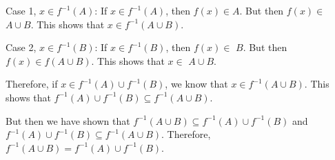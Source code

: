 \documentclass[11pt,letterpaper]{article}
\newcommand{\ansun}[2]{\underline{\hspace{#1}#2\hspace{#1}}} %
\begin{document}
	\hspace{1cm} Case 1, \ansun{0.55cm}{$x \in f^{-1}(A)$}: If $x \in f^{-1}(A)$, then $f(x) \in A$. But then $f(x) \in$ \ansun{0.97cm}{$A \cup B$}. \pspace \hspace{1cm} This shows that $x \in f^{-1}(A \cup B)$. \pvspace{1cm}

	\hspace{1cm} Case 2, $x \in f^{-1}(B)$: If $x \in f^{-1}(B)$, then $f(x) \in$ \ansun{1.32cm}{$B$}. But then $f(x) \in f(A \cup B)$. \pspace \hspace{1cm} This shows that $x \in$ \ansun{0.97cm}{$A \cup B$}. 

Therefore, if $x \in f^{-1}(A) \cup f^{-1}(B)$, we know that $x \in f^{-1}(A \cup B)$. This shows that \ansun{0cm}{$f^{-1}(A) \cup f^{-1}(B) \subseteq f^{-1}(A \cup B)$}. 


But then we have shown that \ansun{0cm}{$f^{-1}(A \cup B) \subseteq f^{-1}(A) \cup f^{-1}(B)$} and \ansun{0cm}{$f^{-1}(A) \cup f^{-1}(B) \subseteq f^{-1}(A \cup B)$}. \pspace Therefore, $f^{-1}(A \cup B)= f^{-1}(A) \cup f^{-1}(B)$. 
\end{document}
